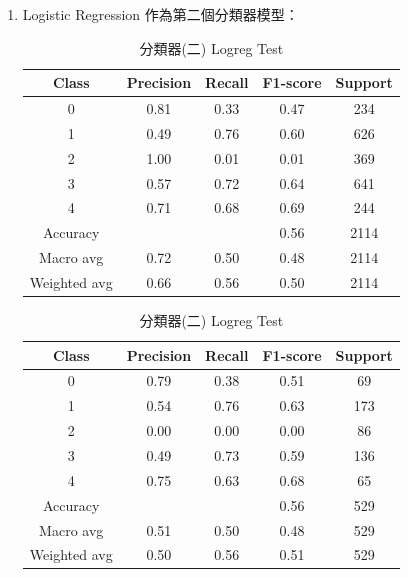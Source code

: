 \begin{enumerate}
        \pagebreak

            \begin{enumerate}
                \item Logistic Regression 作為第二個分類器模型：

                \begin{table}[H]
                \centering
                \scriptsize
                \begin{minipage}{0.48\textwidth}
                \centering
                \begin{tabular}{c|cccc}
                \hline
                Class & Precision & Recall & F1-score & Support \\
                \hline
                0 & 0.81 & 0.33 & 0.47 & 234 \\
                1 & 0.49 & 0.76 & 0.60 & 626 \\
                2 & 1.00 & 0.01 & 0.01 & 369 \\
                3 & 0.57 & 0.72 & 0.64 & 641 \\
                4 & 0.71 & 0.68 & 0.69 & 244 \\
                \hline
                Accuracy &       &      & 0.56 & 2114 \\
                Macro avg & 0.72 & 0.50 & 0.48 & 2114 \\
                Weighted avg & 0.66 & 0.56 & 0.50 & 2114 \\
                \hline
                \end{tabular}
                \caption{分類器(二) Logreg Train}
                \label{tab:classifier_2_report_train_rf_logreg_non_filtered}
                \end{minipage}%
                \hfill
                \begin{minipage}{0.48\textwidth}
                \centering
                \begin{tabular}{c|cccc}
                \hline
                Class & Precision & Recall & F1-score & Support \\
                \hline
                0 & 0.79 & 0.38 & 0.51 & 69 \\
                1 & 0.54 & 0.76 & 0.63 & 173 \\
                2 & 0.00 & 0.00 & 0.00 & 86 \\
                3 & 0.49 & 0.73 & 0.59 & 136 \\
                4 & 0.75 & 0.63 & 0.68 & 65 \\
                \hline
                Accuracy &       &      & 0.56 & 529 \\
                Macro avg & 0.51 & 0.50 & 0.48 & 529 \\
                Weighted avg & 0.50 & 0.56 & 0.51 & 529 \\
                \hline
                \end{tabular}
                \caption{分類器(二) Logreg Test}
                \label{tab:classifier_2_report_test_rf_logreg_non_filtered}
                \end{minipage}
                \end{table}


\end{enumerate}
\end{enumerate}
